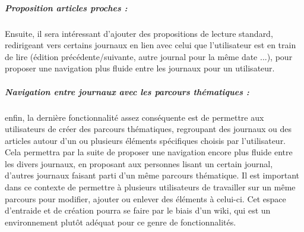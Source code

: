     \subparagraph{Proposition articles proches :}
    Ensuite, il sera intéressant d’ajouter des propositions de lecture standard, redirigeant vers certains
    journaux en lien avec celui que l’utilisateur est en train de lire (édition précédente/suivante,
    autre journal pour la même date ...), pour proposer une navigation plus fluide entre les journaux pour un utilisateur.

    \subparagraph{Navigation entre journaux avec les parcours thématiques :}
    enfin, la dernière fonctionnalité assez conséquente est de permettre aux utilisateurs
    de créer des parcours thématiques, regroupant des journaux ou des articles autour
    d’un ou plusieurs éléments spécifiques choisis par l’utilisateur. Cela permettra
    par la suite de proposer une navigation encore plus fluide entre les divers journaux,
    en proposant aux personnes lisant un certain journal, d’autres journaux faisant parti
    d’un même parcours thématique. Il est important dans ce contexte de permettre à plusieurs utilisateurs
    de travailler sur un même parcours pour modifier, ajouter ou enlever des éléments à celui-ci.
    Cet espace d’entraide et de création pourra se faire par le biais d’un wiki, qui est un environnement
    plutôt adéquat pour ce genre de fonctionnalités.
